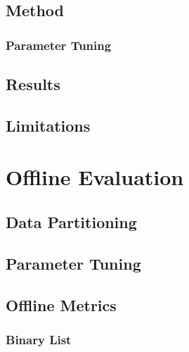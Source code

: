 \subsection{Method}
\subsubsection{Parameter Tuning}
\subsection{Results}
\subsection{Limitations}



\section{Offline Evaluation}

\subsection{Data Partitioning}

\subsection{Parameter Tuning}

\subsection{Offline Metrics}

\subsubsection{Binary List}

